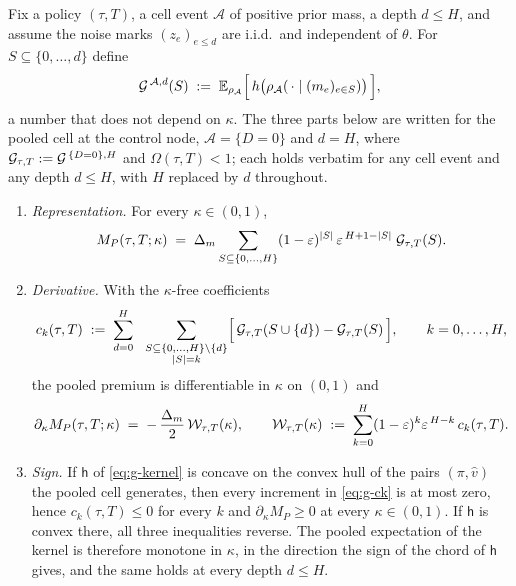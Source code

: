 \begin{lemma}
\label{lem:g3}
Fix a policy $(\tau,T)$, a cell event $\mathcal A$ of positive prior mass, a depth $d \le H$, and
assume the noise marks $(z_e)_{e \le d}$ are i.i.d.\ and independent of $\theta$.
For $S \subseteq \{0,\ldots,d\}$ define
\begin{equation}
\label{eq:g-G}
\mathcal{G}^{\,\mathcal A, d}(S) \;:=\;
\mathbb{E}_{\rho_{\mathcal A}}\Bigl[\, h\bigl(\rho_{\mathcal A}(\,\cdot \mid (m_e)_{e\in S})\bigr)
\,\Bigr],
\end{equation}
a number that does not depend on $\kappa$. The three parts below are written for the pooled cell
at the control node, $\mathcal A = \{D=0\}$ and $d = H$, where
$\mathcal{G}_{\tau,T} := \mathcal{G}^{\,\{D=0\},H}$ and $\Omega(\tau,T) < 1$; each holds verbatim for any
cell event and any depth $d \le H$, with $H$ replaced by $d$ throughout.
\begin{enumerate}[label=(\alph*),leftmargin=2.4em,itemsep=3pt]
\item \emph{Representation.} For every $\kappa \in (0,1)$,
  \begin{equation}
  \label{eq:g-rep}
  M_P(\tau,T;\kappa) \;=\; \Delta_m \sum_{S \subseteq \{0,\ldots,H\}}
  (1-\varepsilon)^{|S|}\,\varepsilon^{\,H+1-|S|}\; \mathcal{G}_{\tau,T}(S).
  \end{equation}
\item \emph{Derivative.} With the $\kappa$-free coefficients
  \begin{equation}
  \label{eq:g-ck}
  c_k(\tau,T) \;:=\; \sum_{d=0}^{H}\ \
  \sum_{\substack{S \subseteq \{0,\ldots,H\}\setminus\{d\} \\ |S| = k}}
  \Bigl[\,\mathcal{G}_{\tau,T}(S \cup \{d\}) - \mathcal{G}_{\tau,T}(S)\,\Bigr],
  \qquad k = 0,\ldots,H,
  \end{equation}
  the pooled premium is differentiable in $\kappa$ on $(0,1)$ and
  \begin{equation}
  \label{eq:g-deriv}
  \partial_\kappa M_P(\tau,T;\kappa) \;=\; -\,\frac{\Delta_m}{2}\,\mathcal{W}_{\tau,T}(\kappa),
  \qquad
  \mathcal{W}_{\tau,T}(\kappa) \;:=\; \sum_{k=0}^{H}(1-\varepsilon)^k \varepsilon^{\,H-k}\,c_k(\tau,T).
  \end{equation}
\item \emph{Sign.} If $\mathsf h$ of \eqref{eq:g-kernel} is concave on the convex hull of the
  pairs $(\pi,\hat v)$ the pooled cell generates, then every increment in \eqref{eq:g-ck} is at
  most zero, hence $c_k(\tau,T)\le 0$ for every $k$ and $\partial_\kappa M_P \ge 0$ at every
  $\kappa \in (0,1)$. If $\mathsf h$ is convex there, all three inequalities reverse. The pooled
  expectation of the kernel is therefore monotone in $\kappa$, in the direction the sign of the
  chord of $\mathsf h$ gives, and the same holds at every depth $d \le H$.
\end{enumerate}
\end{lemma}

